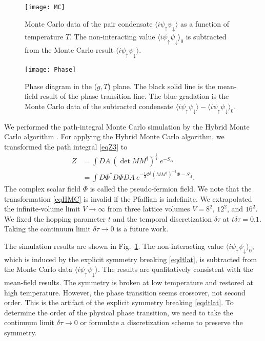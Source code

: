 \documentclass[aps,prb,superscriptaddress,twocolumn]{revtex4-1}
\begin{document}
\begin{figure}[!t]
 \texttt{[image: MC]}
\caption{
Monte Carlo data of the pair condensate $\langle i \psi_\uparrow \psi_\downarrow \rangle$ as a function of temperature $T$.
The non-interacting value $\langle i \psi_\uparrow \psi_\downarrow \rangle_0$ is subtracted from the Monte Carlo result $\langle i \psi_\uparrow \psi_\downarrow \rangle$. 
\label{figMC}
}
\end{figure}
\begin{figure}[t]
 \texttt{[image: Phase]}
\caption{
Phase diagram in the ($g,T$) plane.
The black solid line is the mean-field result of the phase transition line.
The blue gradation is the Monte Carlo data of the subtracted condensate $\langle i \psi_\uparrow \psi_\downarrow \rangle - \langle i \psi_\uparrow \psi_\downarrow \rangle_0$.
\label{figPhase}
}
\end{figure}

We performed the path-integral Monte Carlo simulation by the Hybrid Monte Carlo algorithm \cite{duane1987hybrid}.
For applying the Hybrid Monte Carlo algorithm, we transformed the path integral \eqref{eqZ3} to
\begin{equation}
\begin{split}
 Z  
&= \int DA \ (\det MM^\dagger)^{\frac{1}{4}} \ e^{-S_A}
\\
&= \int D\Phi^* D\Phi DA \ e^{ - \frac{1}{4} \Phi^\dagger (MM^\dagger)^{-1} \Phi - S_A }
.
\label{eqHMC}
\end{split}
\end{equation}
The complex scalar field $\Phi$ is called the pseudo-fermion field.
We note that the transformation \eqref{eqHMC} is invalid if the Pfaffian is indefinite.
We extrapolated the infinite-volume limit $V\to \infty$ from three lattice volumes $V=8^2$, $12^2$, and $16^2$.
We fixed the hopping parameter $t$ and the temporal discretization $\delta\tau$ at $t\delta\tau=0.1$.
Taking the continuum limit $\delta\tau \to 0$ is a future work.

The simulation results are shown in Fig.~\ref{figMC}.
The non-interacting value $\langle i \psi_\uparrow \psi_\downarrow \rangle_0$, which is induced by the explicit symmetry breaking \eqref{eqdtlat}, is subtracted from the Monte Carlo data $\langle i \psi_\uparrow \psi_\downarrow \rangle$. 
The results are qualitatively consistent with the mean-field results.
The symmetry is broken at low temperature and restored at high temperature.
However, the phase transition seems crossover, not second order.
This is the artifact of the explicit symmetry breaking \eqref{eqdtlat}.
To determine the order of the physical phase transition, we need to take the continuum limit $\delta\tau \to 0$ or formulate a discretization scheme to preserve the symmetry.
\end{document}
